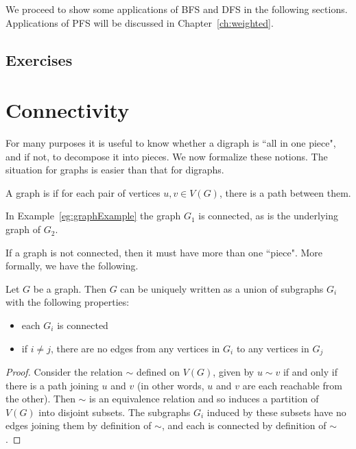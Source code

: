 We proceed to show some applications of BFS and DFS in the following
sections. Applications of PFS will be discussed in
Chapter~\ref{ch:weighted}.

\subsection*{Exercises}

\section{Connectivity}
\label{sec:connectivity}

For many purposes it is useful to know whether a digraph is ``all in one
piece", and if not, to decompose it into pieces. We now formalize these
notions. The situation for graphs is easier than that for digraphs.

\begin{Definition} A graph is  if for each pair of 
vertices $u, v\in V(G)$, there is a path between them.

\end{Definition}

In Example~\ref{eg:graphExample} the graph $G_1$ is connected, as is the
underlying graph of $G_2$. 

If a graph is not connected, then it must have more than one ``piece".
More formally, we have the following.

\begin{Theorem}
\label{thm:components}
Let $G$ be a graph. Then $G$ can be uniquely written as a union of
subgraphs $G_i$ with the following properties:
\begin{itemize}
\item each $G_i$ is connected
\item if $i\neq j$, there are no edges from any vertices in $G_i$ to any vertices in $G_j$
\end{itemize}

\end{Theorem}

\begin{proof}
Consider the relation $\sim$ defined on $V(G)$, given by $u\sim v$ if
and only if there is a path joining $u$ and $v$ (in other words, $u$ and
$v$ are each reachable from the other). Then $\sim$ is an equivalence
relation and so induces a partition of $V(G)$ into disjoint subsets. The
subgraphs $G_i$ induced by these subsets have no edges joining them by
definition of $\sim$, and each is connected by definition of $\sim$.
\end{proof}

